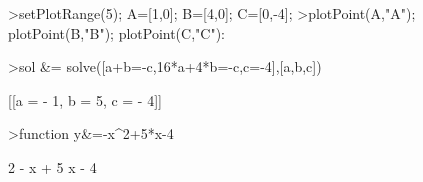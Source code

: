 \documentclass[12pt,Times new roman,letterpaper]{book}
\begin{document}
\begin{eulernootebook}
\begin{eulercomment}
\begin{eulercomment}
\begin{eulernootebook}
\begin{eulercomment}
\begin{eulercomment}
\begin{eulercomment}
\begin{eulercomment}
\begin{eulercomment}
\begin{eulercomment}
\begin{eulernotebook}
\begin{eulercomment}
\begin{eulercomment}
\begin{eulercomment}
\begin{eulercomment}
\begin{eulercomment}
\begin{eulercomment}
\end{eulercomment}
\begin{eulerprompt}
>setPlotRange(5); A=[1,0]; B=[4,0]; C=[0,-4];
>plotPoint(A,"A"); plotPoint(B,"B"); plotPoint(C,"C"):
\end{eulerprompt}
\begin{eulerprompt}
>sol &= solve([a+b=-c,16*a+4*b=-c,c=-4],[a,b,c])
\end{eulerprompt}
\begin{euleroutput}
  
                       [[a = - 1, b = 5, c = - 4]]
  
\end{euleroutput}
\begin{eulerprompt}
>function y&=-x^2+5*x-4
\end{eulerprompt}
\begin{euleroutput}
  
                                 2
                              - x  + 5 x - 4
  

\end{euleroutput}
\end{eulercomment}
\end{eulercomment}
\end{eulercomment}
\end{eulercomment}
\end{eulercomment}
\end{eulernotebook}
\end{eulercomment}
\end{eulercomment}
\end{eulercomment}
\end{eulercomment}
\end{eulercomment}
\end{eulercomment}
\end{eulernootebook}
\end{eulercomment}
\end{eulercomment}
\end{eulernootebook}
\end{document}
